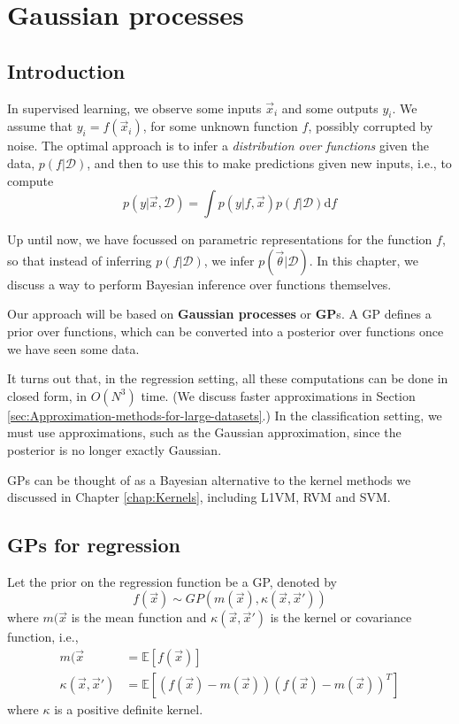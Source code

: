 \chapter{Gaussian processes}


\section{Introduction}
In supervised learning, we observe some inputs $\vec{x}_i$ and some outputs $y_i$. We assume that $y_i =f(\vec{x}_i)$, for some unknown function $f$, possibly corrupted by noise. The optimal approach is to infer a \emph{distribution over functions} given the data, $p(f|\mathcal{D})$, and then to use this to make predictions given new inputs, i.e., to compute
\begin{equation}
p(y|\vec{x},\mathcal{D})=\int p(y|f,\vec{x})p(f|\mathcal{D})\mathrm{d}f
\end{equation}

Up until now, we have focussed on parametric representations for the function $f$, so that instead of inferring $p(f|\mathcal{D})$, we infer $p(\vec{\theta}|\mathcal{D})$. In this chapter, we discuss a way to perform Bayesian inference over functions themselves.

Our approach will be based on \textbf{Gaussian processes} or \textbf{GP}s. A GP defines a prior over functions, which can be converted into a posterior over functions once we have seen some data. 

It turns out that, in the regression setting, all these computations can be done in closed form, in $O(N^3)$ time. (We discuss faster approximations in Section \ref{sec:Approximation-methods-for-large-datasets}.) In the classification setting, we must use approximations, such as the Gaussian approximation, since the posterior is no longer exactly Gaussian.

GPs can be thought of as a Bayesian alternative to the kernel methods we discussed in Chapter \ref{chap:Kernels}, including L1VM, RVM and SVM.


\section{GPs for regression}
Let the prior on the regression function be a GP, denoted by
\begin{equation}
f(\vec{x}) \sim GP(m(\vec{x}),\kappa(\vec{x},\vec{x}'))
\end{equation}
where $m(\vec{x}$ is the mean function and $\kappa(\vec{x},\vec{x}')$ is the kernel or covariance function, i.e.,
\begin{align}
m(\vec{x} & = \mathbb{E}[f(\vec{x})] \\
\kappa(\vec{x},\vec{x}') & = \mathbb{E}[(f(\vec{x})-m(\vec{x}))(f(\vec{x})-m(\vec{x}))^T]
\end{align}
where $\kappa$ is a positive definite kernel.


